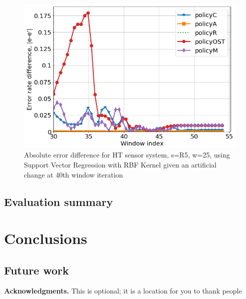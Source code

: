 \documentclass{mpaper}
\begin{document}
\begin{figure}[h]
    \centering
    \includegraphics[scale=0.3]{imgs/svr_rbf_R5_w25.png}
    \caption{Absolute error difference for HT sensor system, s=R5, w=25,
    using Support Vector Regression with RBF Kernel 
    given an artificial change at 40th window iteration}
    \label{fig:err_rbf_svr_R5}
\end{figure}

\subsection{Evaluation summary}

\section{Conclusions}

\subsection*{Future work}

{\bf Acknowledgments.}
This is optional; it is a location for you to thank people



\end{document}
